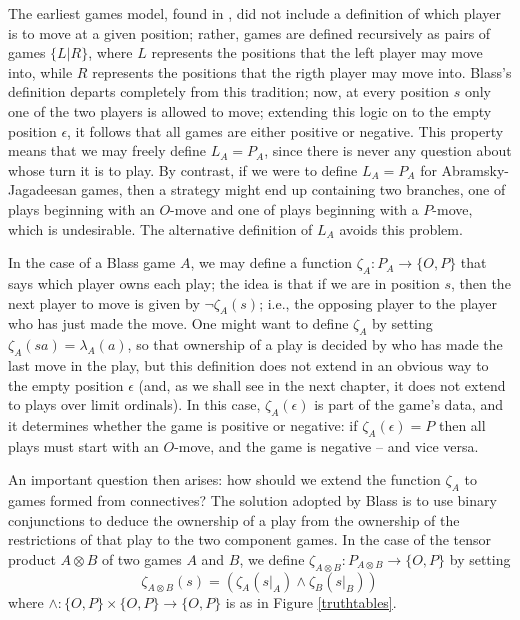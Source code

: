 \documentclass[11pt]{article} %
\theoremstyle{plain} %
\theoremstyle{definition} %
\theoremstyle{note}
\theoremstyle{exercisestyle}
\newcommand*\from{\colon}
\newcommand{\cmap}[3]{#1\from{}#2\to{}#3}
\newcommand{\tensor}{\otimes}
\newcommand{\OP}{\{O,P\}}
\newcommand{\emptyplay}{\epsilon}
\begin{document}
The earliest games model, found in \cite{conwaygames}, did not include a definition of which player is to move at a given position; rather, games are defined recursively as pairs of games $\{L|R\}$, where $L$ represents the positions that the left player may move into, while $R$ represents the positions that the rigth player may move into.  Blass's definition departs completely from this tradition; now, at every position $s$ only one of the two players is allowed to move; extending this logic on to the empty position $\emptyplay$, it follows that all games are either positive or negative.  This property means that we may freely define $L_A=P_A$, since there is never any question about whose turn it is to play.  By contrast, if we were to define $L_A=P_A$ for Abramsky-Jagadeesan games, then a strategy might end up containing two branches, one of plays beginning with an $O$-move and one of plays beginning with a $P$-move, which is undesirable.  The alternative definition of $L_A$ avoids this problem.

In the case of a Blass game $A$, we may define a function $\zeta_A\colon P_A\to\OP$ that says which player owns each play; the idea is that if we are in position $s$, then the next player to move is given by $\neg\zeta_A(s)$; i.e., the opposing player to the player who has just made the move.  One might want to define $\zeta_A$ by setting $\zeta_A(sa)=\lambda_A(a)$, so that ownership of a play is decided by who has made the last move in the play, but this definition does not extend in an obvious way to the empty position $\emptyplay$ (and, as we shall see in the next chapter, it does not extend to plays over limit ordinals).  In this case, $\zeta_A(\emptyplay)$ is part of the game's data, and it determines whether the game is positive or negative: if $\zeta_A(\emptyplay) = P$ then all plays must start with an $O$-move, and the game is negative -- and vice versa.

An important question then arises: how should we extend the function $\zeta_A$ to games formed from connectives?  The solution adopted by Blass is to use binary conjunctions to deduce the ownership of a play from the ownership of the restrictions of that play to the two component games.  In the case of the tensor product $A\tensor B$ of two games $A$ and $B$, we define $\cmap{\zeta_{A\tensor B}}{P_{A\tensor B}}{\OP}$ by setting
\[
  \zeta_{A\tensor B}(s) = (\zeta_A(s\vert_A) \wedge \zeta_B(s\vert_B))
  \]
where $\cmap{\wedge}{\OP\times \OP}{\OP}$ is as in Figure \ref{truthtables}.
\end{document}
